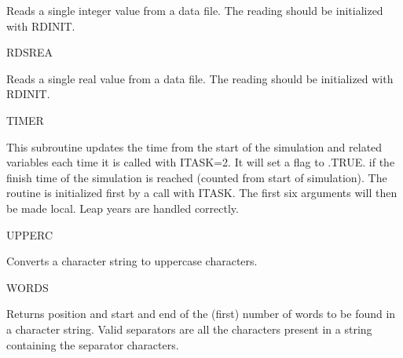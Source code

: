 \begin{indenting}{2.54cm}
Reads a single integer value from a data file. The reading should be
initialized with RDINIT.
\end{indenting}
RDSREA
\testlastline

\begin{indenting}{2.54cm}
Reads a single real value from a data file. The reading should be initialized
with RDINIT.
\end{indenting}
TIMER
\testlastline

\begin{indenting}{2.54cm}
This subroutine updates the time from the start of the simulation and
related variables each time it is called with ITASK=2. It will set a flag to
.TRUE. if the finish time of the simulation is reached (counted from start
of simulation). The routine is initialized first by a call with ITASK. The
first six arguments will then be made local. Leap years are handled correct\-ly.
\end{indenting}
UPPERC
\testlastline

\begin{indenting}{2.54cm}
Converts a character string to uppercase characters.
\end{indenting}
WORDS
\testlastline

\begin{indenting}{2.54cm}
Returns position and start and end of the (first) number of words to be
found in a character string. Valid separators are all the characters present
in a string containing the separator characters. 
\end{indenting}

